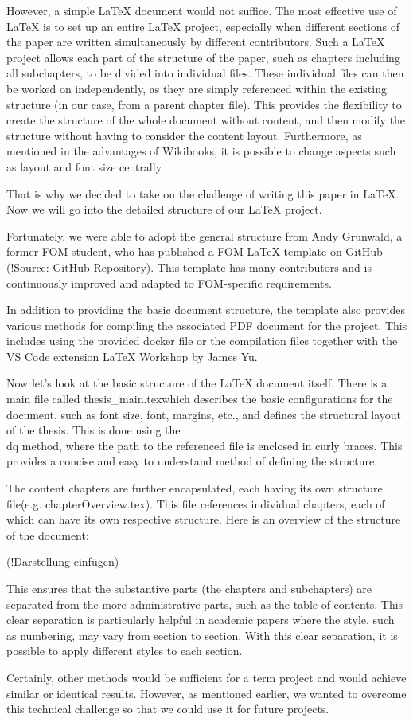 However, a simple \LaTeX{} document would not suffice. The most effective use of \LaTeX{} is to set up an entire \LaTeX{} project, especially when different sections of the paper are written simultaneously by different contributors. Such a \LaTeX{} project allows each part of the structure of the paper, such as chapters including all subchapters, to be divided into individual files. These individual files can then be worked on independently, as they are simply referenced within the existing structure (in our case, from a parent chapter file). This provides the flexibility to create the structure of the whole document without content, and then modify the structure without having to consider the content layout. Furthermore, as mentioned in the advantages of Wikibooks, it is possible to change aspects such as layout and font size centrally.

That is why we decided to take on the challenge of writing this paper in \LaTeX{}. Now we will go into the detailed structure of our \LaTeX{} project.

Fortunately, we were able to adopt the general structure from Andy Grunwald, a former FOM student, who has published a \dq FOM \LaTeX{} template \dq  on GitHub (!Source: GitHub Repository). This template has many contributors and is continuously improved and adapted to FOM-specific requirements.

In addition to providing the basic document structure, the template also provides various methods for compiling the associated PDF document for the project. This includes using the provided docker file or the compilation files together with the VS Code extension \dq \LaTeX{} Workshop \dq  by James Yu.

Now let's look at the basic structure of the \LaTeX{} document itself. There is a main file called \dq thesis\_main.tex\dq  which describes the basic configurations for the document, such as font size, font, margins, etc., and defines the structural layout of the thesis. This is done using the \dq \\dq  method, where the path to the referenced file is enclosed in curly braces. This provides a concise and easy to understand method of defining the structure.

The content chapters are further encapsulated, each having its own \dq structure file\dq  (e.g. chapterOverview.tex). This file references individual chapters, each of which can have its own respective structure. Here is an overview of the structure of the document:

(!Darstellung einfügen)

This ensures that the substantive parts (the chapters and subchapters) are separated from the more administrative parts, such as the table of contents. This clear separation is particularly helpful in academic papers where the style, such as numbering, may vary from section to section. With this clear separation, it is possible to apply different styles to each section.

Certainly, other methods would be sufficient for a term project and would achieve similar or identical results. However, as mentioned earlier, we wanted to overcome this technical challenge so that we could use it for future projects.